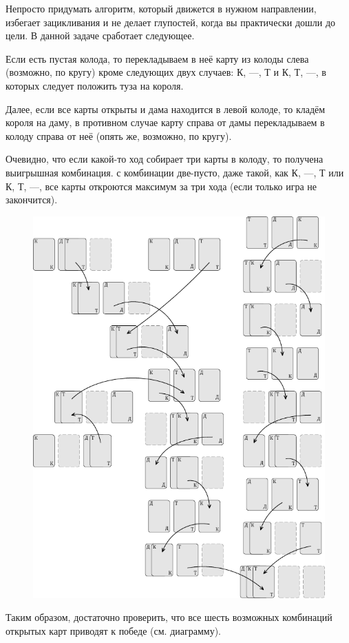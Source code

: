 \documentclass[twoside]{book}
\begin{document}
Непросто придумать алгоритм, который движется в нужном направлении, избегает зацикливания и не делает глупостей, когда вы практически дошли до цели.
В данной задаче сработает следующее.

\medskip

Если есть пустая колода, то перекладываем в неё карту из колоды слева (возможно, по кругу) кроме следующих двух случаев: К, ---, Т и К, Т, ---, в которых следует положить туза на короля.

Далее, если все карты открыты и дама находится в левой колоде, то кладём короля на даму, в противном случае карту справа от дамы перекладываем в колоду справа от неё (опять же, возможно, по кругу).

Очевидно, что если какой-то ход собирает три карты в колоду, то получена выигрышная комбинация.
 с комбинации две-пусто, даже такой, как К, ---, Т или
К, Т, ---, все карты откроются максимум за три хода (если только игра не закончится).
\begin{figure}[!ht]
\centering
 \includegraphics{mp/wink-24}
\end{figure}
Таким образом, достаточно проверить, что все шесть возможных комбинаций открытых карт приводят к победе  (см. диаграмму).
\heart
\end{document}
